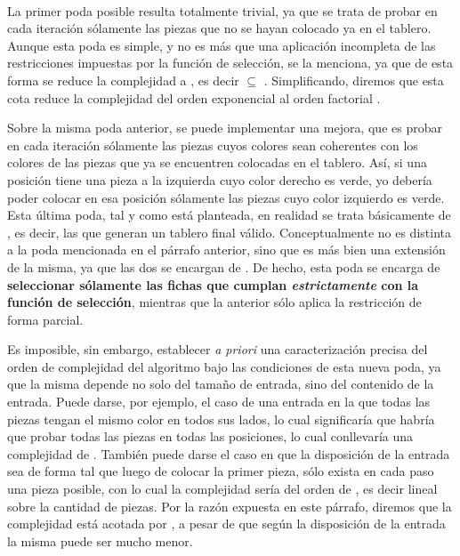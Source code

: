 \documentclass[11pt, a4paper, twoside]{article}
\begin{document}
\begin{paragraph}\


La primer poda posible resulta totalmente trivial, ya que se trata de probar
en cada iteración sólamente las piezas que no se hayan colocado ya en el
tablero. Aunque esta poda es simple, y no es más que una aplicación incompleta
de las restricciones impuestas por la función de selección, se la menciona, ya
que de esta forma se reduce la complejidad a
, es decir 
$\subseteq$ . Simplificando, diremos que esta cota reduce la
complejidad del orden exponencial  al orden factorial .

Sobre la misma poda anterior, se puede implementar una mejora, que es probar
en cada iteración sólamente las piezas cuyos colores sean coherentes con los
colores de las piezas que ya se encuentren colocadas en el tablero. Así, si
una posición tiene una pieza a la izquierda cuyo color derecho es verde, yo
debería poder colocar en esa posición sólamente las piezas cuyo color
izquierdo es verde. Esta última poda, tal y como está planteada, en realidad
se trata básicamente de \textbf{}, es decir, las que generan un
tablero final válido. Conceptualmente no es distinta a la poda mencionada en
el párrafo anterior, sino que es más bien una extensión de la misma, ya que
las dos se encargan de . De hecho, esta poda
se encarga de \textbf{seleccionar sólamente las fichas que cumplan
\emph{estrictamente} con la función de selección}, mientras que la anterior
sólo aplica la restricción de forma parcial.

Es imposible, sin embargo, establecer \emph{a priori} una caracterización
precisa del orden de complejidad del algoritmo bajo las condiciones de esta
nueva poda, ya que la misma depende no solo del tamaño de entrada, sino del
contenido de la entrada. Puede darse, por ejemplo, el caso de una entrada en
la que todas las piezas tengan el mismo color en todos sus lados, lo cual
significaría que habría que probar todas las piezas en todas las posiciones,
lo cual conllevaría una complejidad de . También puede darse el caso
en que la disposición de la entrada sea de forma tal que luego de colocar la
primer pieza, sólo exista en cada paso una pieza posible, con lo cual la
complejidad sería del orden de , es decir  lineal sobre
la cantidad de piezas. Por la razón expuesta en este párrafo, diremos que la
complejidad está acotada por , a pesar de que según la disposición
de la entrada la misma puede ser mucho menor.


\end{paragraph}
\end{document}
